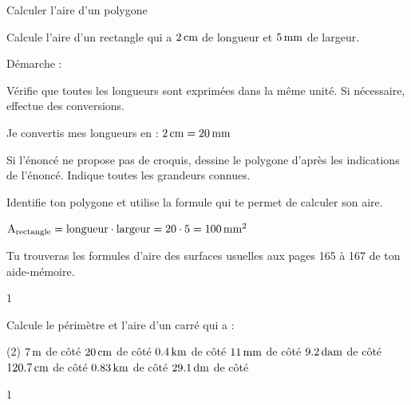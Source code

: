 \documentclass[a4paper,11pt]{report}
\let\oldcenter\center
\let\oldendcenter\endcenter
\renewenvironment{center}{\setlength\topsep{-10pt}\oldcenter}{\oldendcenter}
\begin{document}
\begin{resolu}{Calculer l'aire d'un polygone}{
		Calcule l'aire d'un rectangle qui a $\tunit{2}{cm}$ de longueur et $\tunit{5}{mm}$ de largeur.

Démarche :
\begin{tasks}
    \task Vérifie que toutes les longueurs sont exprimées dans la même unité. Si nécessaire, effectue des conversions.
    
{\color{blue} Je convertis mes longueurs en  : $\tunit{2}{cm}=\tunit{20}{mm}$}
    
    \task Si l'énoncé ne propose pas de croquis, dessine le polygone d'après les indications de l'énoncé. Indique toutes les grandeurs connues. 
    \begin{center}
    \end{center}
\vspace{-0.8cm}
    \task Identifie ton polygone et utilise la formule qui te permet de calculer son aire. 
      
{\color{blue} $\textrm{A}_{\textrm{rectangle}}=\textrm{longueur}\cdot\textrm{largeur}=20\cdot5=\tunit{100}{mm^2}$}
\end{tasks}

\bigskip

{\color{red} \faExclamationTriangle} Tu trouveras les formules d'aire des surfaces usuelles aux pages 165 à 167 de ton aide-mémoire.
}{1}
\end{resolu}


\begin{exo}{
Calcule le périmètre et l'aire d'un carré qui a :
\begin{tasks}(2)
	\task $\tunit{7}{m}$ de côté
	\task $\tunit{20}{cm}$ de côté
    \task $\tunit{0,4}{km}$ de côté
    \task $\tunit{11}{mm}$ de côté
    \task $\tunit{9,2}{dam}$ de côté
    \task $\tunit{120,7}{cm}$ de côté
    \task $\tunit{0,83}{km}$ de côté
    \task $\tunit{29,1}{dm}$ de côté
\end{tasks}
}{1}
\end{exo}
\end{document}
